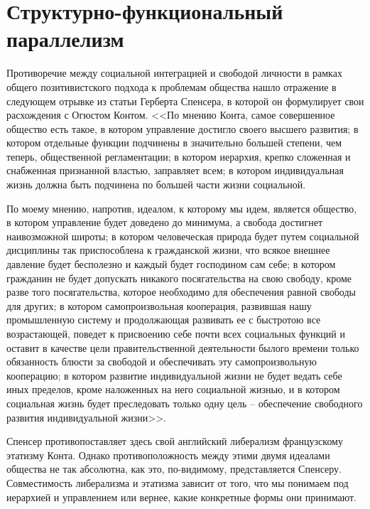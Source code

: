 \documentclass{book}
\begin{document}
\section{Структурно-функциональный параллелизм}

Противоречие между социальной интеграцией и свободой личности в рамках общего позитивистского подхода к пробле­мам общества нашло отражение в следующем отрывке из статьи Герберта Спенсера, в которой он формулирует свои расхож­дения с Огюстом Контом.
<<По мнению Конта, самое совершенное общество есть такое, в котором управление  достигло своего высшего развития; в котором отдельные функции подчинены в значительно большей степени, чем теперь, общественной регламентации; в котором иерархия, крепко сложенная и снабженная признанной властью, заправляет всем; в котором индивидуальная жизнь должна быть подчинена по большей части жизни социальной.

По моему мнению, напротив, идеалом, к которому мы идем, является общество, в котором управление  будет доведено до минимума, а свобода достигнет наивозможной широты; в ко­тором человеческая природа будет путем социальной дисцип­лины так приспособлена к гражданской жизни, что всякое внешнее давление будет бесполезно и каждый будет господи­ном сам себе; в котором гражданин не будет допускать ника­кого посягательства на свою свободу, кроме разве того пося­гательства, которое необходимо для обеспечения равной сво­боды для других; в котором самопроизвольная кооперация, развившая нашу промышленную систему и продолжающая раз­вивать ее с быстротою все возрастающей, поведет к присвоению себе почти всех социальных функций и оставит в качестве цели правительственной деятельности былого времени только обя­занность блюсти за свободой и обеспечивать эту самопроизволь­ную кооперацию; в котором развитие индивидуальной жизни не будет ведать себе иных пределов, кроме наложенных на не­го социальной жизнью, и в котором 
социальная жизнь будет преследовать только одну цель -- обеспечение свободного раз­вития индивидуальной жизни>>.

Спенсер противопоставляет здесь свой английский либера­лизм французскому этатизму Конта. Однако противополож­ность между этими двумя идеалами общества не так абсолютна, как это, по-видимому, представляется Спенсеру. Совместимость либерализма и этатизма зависит от того, что мы понимаем под иерархией и управлением или вернее, какие конкретные формы они принимают.
\end{document}
